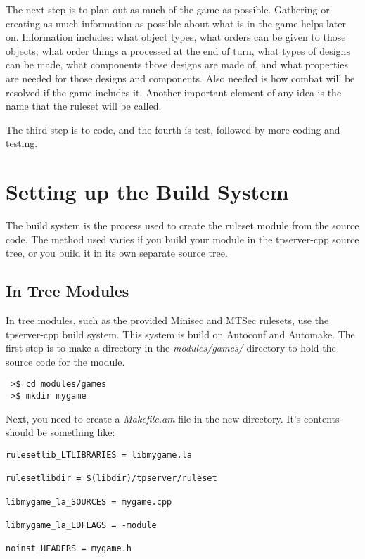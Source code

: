 \documentclass[a4paper,11pt]{report}
\newcommand{\filename}[1]{\emph{#1}}
\begin{document}
The next step is to plan out as much of the game as possible. Gathering or creating as much information as possible about what is in the game helps later on. Information includes: what object types, what orders can be given to those objects, what order things a processed at the end of turn, what types of designs can be made, what components those designs are made of, and what properties are needed for those designs and components.  Also needed is how combat will be resolved if the game includes it.
Another important element of any idea is the name that the ruleset will be called.


The third step is to code, and the fourth is test, followed by more coding and testing.


\chapter{Setting up the Build System}
\label{chap:build-system}

The build system is the process used to create the ruleset module from the source code. The method used varies if you build your module in the tpserver-cpp source tree, or you build it in its own separate source tree.



\section{In Tree Modules}
\label{sec:intree-module-build}

In tree modules, such as the provided Minisec and MTSec rulesets, use the tpserver-cpp build system. This system is build on Autoconf and Automake.  The first step is to make a directory in the \filename{modules/games/} directory to hold the source code for the module. 

\begin{verbatim}
 >$ cd modules/games
 >$ mkdir mygame
\end{verbatim}

Next, you need to create a \filename{Makefile.am} file in the new directory. It's contents should be something like:

\begin{verbatim}
rulesetlib_LTLIBRARIES = libmygame.la

rulesetlibdir = $(libdir)/tpserver/ruleset

libmygame_la_SOURCES = mygame.cpp

libmygame_la_LDFLAGS = -module

noinst_HEADERS = mygame.h
\end{verbatim}
\end{document}
